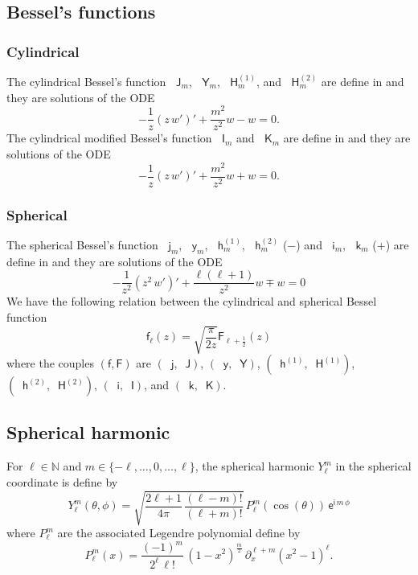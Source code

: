 \documentclass[12pt,a4paper]{article}
\theoremstyle{definition}
\theoremstyle{plain}
\theoremstyle{remark}
\newcommand{\bbN}{\mathbb{N}}
\newcommand{\ex}{\mathsf{e}}
\newcommand{\im}{\mathsf{i}}
\newcommand{\bJ}{\mathop{}\!\mathsf{J}}
\newcommand{\bY}{\mathop{}\!\mathsf{Y}}
\newcommand{\Hu}{\mathop{}\!\mathsf{H}^{(1)}}
\newcommand{\Hd}{\mathop{}\!\mathsf{H}^{(2)}}
\newcommand{\bI}{\mathop{}\!\mathsf{I}}
\newcommand{\bK}{\mathop{}\!\mathsf{K}}
\newcommand{\bj}{\mathop{}\!\mathsf{j}}
\newcommand{\by}{\mathop{}\!\mathsf{y}}
\newcommand{\hu}{\mathop{}\!\mathsf{h}^{(1)}}
\newcommand{\hd}{\mathop{}\!\mathsf{h}^{(2)}}
\newcommand{\bi}{\mathop{}\!\mathsf{i}}
\newcommand{\bk}{\mathop{}\!\mathsf{k}}
\newcommand{\plr}[1]{\left(#1\right)}
\begin{document}
\subsection{Bessel's functions}

%
\subsubsection{Cylindrical}
%

The cylindrical Bessel's function $\bJ_m$, $\bY_m$, $\Hu_m$, and $\Hd_m$ are define in \cite[Sec.~10.2]{NIST:DLMF} and they are solutions of the ODE
\[
    -\frac{1}{z}\plr{z\, w'}' + \frac{m^2}{z^2}w - w = 0.
\]
The cylindrical modified Bessel's function $\bI_m$ and $\bK_m$ are define in \cite[Sec.~10.25]{NIST:DLMF} and they are solutions of the ODE
\[
    -\frac{1}{z}\plr{z\, w'}' + \frac{m^2}{z^2}w + w = 0.
\]

%
\subsubsection{Spherical}
%

The spherical Bessel's function $\bj_m$, $\by_m$, $\hu_m$, $\hd_m$ ($-$) and $\bi_m$, $\bk_m$ ($+$) are define in \cite[Sec.~10.47]{NIST:DLMF} and they are solutions of the ODE
\[
    -\frac{1}{z^2}\plr{z^2\, w'}' + \frac{\ell(\ell+1)}{z^2}w \mp w = 0
\]
We have the following relation between the cylindrical and spherical Bessel function
\[
    \mathsf{f}_\ell(z) = \sqrt{\frac{\pi}{2z}} \mathsf{F}_{\ell+\frac{1}{2}}(z)
\]
where the couples $(\mathsf{f}, \mathsf{F})$ are $(\bj, \bJ)$, $(\by, \bY)$, $(\hu, \Hu)$, $(\hd, \Hd)$, $(\bi, \bI)$, and $(\bk, \bK)$.

\subsection{Spherical harmonic}

For $\ell \in \bbN$ and $m \in \{-\ell, \ldots, 0, \ldots, \ell\}$, the spherical harmonic $Y_\ell^m$ in the spherical coordinate is define by
\[
    Y_\ell^m(\theta, \phi) = \sqrt{\frac{2\ell+1}{4\pi}\, \frac{(\ell-m)!
        }{(\ell+m)!}}\, P_\ell^m(\cos(\theta))\, \ex^{\im\, m\, \phi}
\]
where $P_\ell^m$ are the associated Legendre polynomial define by
\[
    P_\ell^m(x) = \frac{(-1)^m}{2^\ell\, \ell!}\, (1-x^2)^{\frac{m}{2}}\, \partial_x^{\ell+m} (x^2-1)^\ell.
\]
\end{document}
